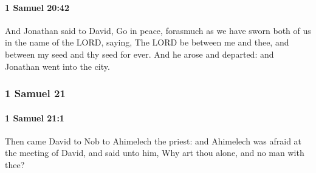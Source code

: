 		\paragraph{1 Samuel 20:42} %
			\label{1SAMUEL-20-42}

			And Jonathan said to David, Go in peace, forasmuch as we have sworn both of us in the name of the LORD, saying, The LORD be between me and thee, and between my seed and thy seed for ever. And he arose and departed: and Jonathan went into the city.

	\subsubsection{1 Samuel 21} %
		\label{1SAMUEL-21}

		\paragraph{1 Samuel 21:1} %
			\label{1SAMUEL-21-1}

			Then came David to Nob to Ahimelech the priest: and Ahimelech was afraid at the meeting of David, and said unto him, Why art thou alone, and no man with thee?

